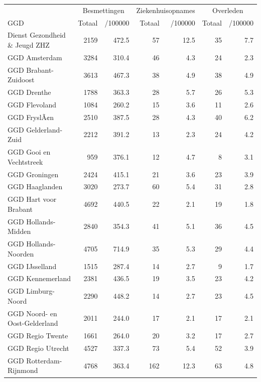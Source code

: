 \documentclass[
  english,
  man,floatsintext]{apa6}
\begin{document}
\begin{table}
\centering\begingroup\fontsize{10}{12}\selectfont

\begin{threeparttable}
\begin{tabular}{lrrrrrr}
\toprule
\multicolumn{1}{c}{ } & \multicolumn{2}{c}{Besmettingen} & \multicolumn{2}{c}{Ziekenhuisopnames} & \multicolumn{2}{c}{Overleden} \\
\cmidrule(l{3pt}r{3pt}){2-3} \cmidrule(l{3pt}r{3pt}){4-5} \cmidrule(l{3pt}r{3pt}){6-7}
GGD & Totaal & /100000 & Totaal & /100000 & Totaal & /100000\\
\midrule
Dienst Gezondheid \& Jeugd ZHZ & 2159 & 472.5 & 57 & 12.5 & 35 & 7.7\\
GGD Amsterdam & 3284 & 310.4 & 46 & 4.3 & 24 & 2.3\\
GGD Brabant-Zuidoost & 3613 & 467.3 & 38 & 4.9 & 38 & 4.9\\
GGD Drenthe & 1788 & 363.3 & 28 & 5.7 & 26 & 5.3\\
GGD Flevoland & 1084 & 260.2 & 15 & 3.6 & 11 & 2.6\\
GGD FryslÃ¢n & 2510 & 387.5 & 28 & 4.3 & 40 & 6.2\\
GGD Gelderland-Zuid & 2212 & 391.2 & 13 & 2.3 & 24 & 4.2\\
GGD Gooi en Vechtstreek & 959 & 376.1 & 12 & 4.7 & 8 & 3.1\\
GGD Groningen & 2424 & 415.1 & 21 & 3.6 & 23 & 3.9\\
GGD Haaglanden & 3020 & 273.7 & 60 & 5.4 & 31 & 2.8\\
GGD Hart voor Brabant & 4692 & 440.5 & 22 & 2.1 & 19 & 1.8\\
GGD Hollands-Midden & 2840 & 354.3 & 41 & 5.1 & 36 & 4.5\\
GGD Hollands-Noorden & 4705 & 714.9 & 35 & 5.3 & 29 & 4.4\\
GGD IJsselland & 1515 & 287.4 & 14 & 2.7 & 9 & 1.7\\
GGD Kennemerland & 2381 & 436.5 & 19 & 3.5 & 23 & 4.2\\
GGD Limburg-Noord & 2290 & 448.2 & 14 & 2.7 & 23 & 4.5\\
GGD Noord- en Oost-Gelderland & 2011 & 244.0 & 17 & 2.1 & 17 & 2.1\\
GGD Regio Twente & 1661 & 264.0 & 20 & 3.2 & 17 & 2.7\\
GGD Regio Utrecht & 4527 & 337.3 & 73 & 5.4 & 52 & 3.9\\
GGD Rotterdam-Rijnmond & 4768 & 363.4 & 162 & 12.3 & 63 & 4.8\\

\end{tabular}
\end{threeparttable}
\end{table}
\end{document}
